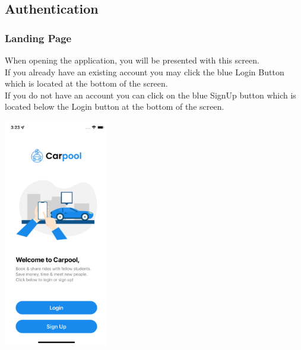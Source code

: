 \documentclass[hidelinks, 12pt, a4paper]{article}
\begin{document}
\subsection{Authentication}
\subsubsection{Landing Page}
When opening the application, you will be presented with this screen. \\
If you already have an existing account you may click the blue Login Button which is located at the bottom of the screen. \\
If you do not have an account you can click on the blue SignUp button which is located below the Login button at the bottom of the screen.
\begin{center}
  \includegraphics[height=10cm]{images/Simulator Screen Shot - iPhone X - 2022-06-10 at 03.23.06.png}
\end{center}
\end{document}
